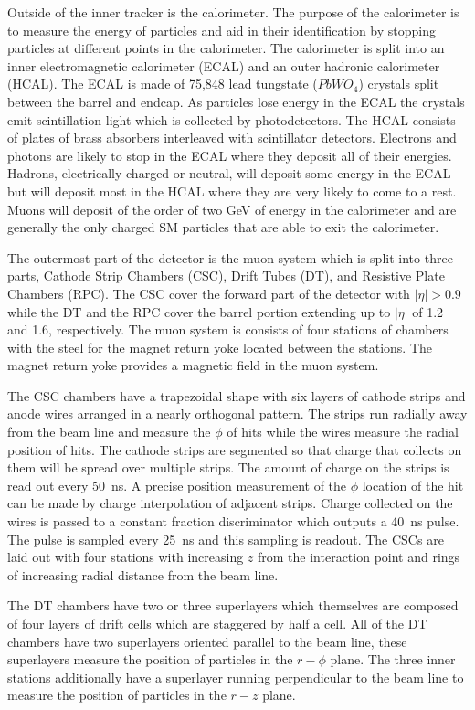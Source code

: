 Outside of the inner tracker is the calorimeter. The purpose of the calorimeter is to measure the energy of particles and aid in their identification by stopping
particles at different points in the calorimeter.  The calorimeter is split into an inner electromagnetic calorimeter (ECAL) and an outer hadronic calorimeter (HCAL). 
The ECAL is made of 75,848 lead tungstate ($PbWO_4$) crystals split between the barrel and endcap. As particles lose energy in the ECAL
the crystals emit scintillation light which is collected by photodetectors. The HCAL consists of plates of brass absorbers interleaved with scintillator
detectors.  Electrons and photons are likely to stop in the ECAL where they deposit all of their energies. Hadrons, electrically charged or neutral, will
deposit some energy in the ECAL but will deposit most in the HCAL where they are very likely to come to a rest. Muons will deposit of the order of two GeV of energy in
the calorimeter and are generally the only charged SM particles that are able to exit the calorimeter.

The outermost part of the detector is the muon system which is split into three parts, Cathode Strip Chambers (CSC), Drift Tubes (DT), and Resistive Plate Chambers (RPC).
The CSC cover the forward part of the detector with $|\eta|>0.9$ while the DT and the RPC cover the barrel portion extending up to $|\eta|$ of 1.2 and 1.6, respectively.
The muon system is consists of four stations of chambers with the steel for the magnet return yoke located between the stations. The magnet return yoke provides a magnetic field
in the muon system.

The CSC chambers have a trapezoidal shape with six layers of cathode strips and anode wires arranged in a nearly orthogonal pattern. 
The strips run radially away from the beam line and measure the $\phi$ of hits while the wires measure the radial position of hits.
The cathode strips are segmented so that charge that collects on them will be spread over multiple strips.
The amount of charge on the strips is read out every 50~ns. A precise position measurement of the $\phi$ location of the hit can be made
by charge interpolation of adjacent strips. Charge collected on the wires
is passed to a constant fraction discriminator which outputs a 40~ns pulse. The pulse is sampled every 25~ns and this sampling is readout.
The CSCs are laid out with four stations with increasing $z$ from the interaction point and rings of increasing radial distance from the beam line.

The DT chambers have two or three superlayers which themselves are composed of four layers of drift cells which are staggered by half a cell. All of the DT chambers have
two superlayers oriented parallel to the beam line, these superlayers measure the position of particles in the $r-\phi$ plane.
The three inner stations additionally have a superlayer running perpendicular to the beam line to measure the position of particles in the $r-z$ plane.

